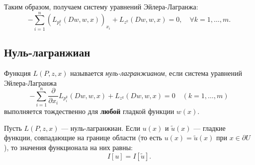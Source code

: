Таким образом, получаем систему уравнений Эйлера-Лагранжа:
\begin{equation}
    - \sum_{i=1}^n (L_{p_i^k} (Dw, w, x))_{x_i} + L_{z^k}(Dw, w, x) = 0, \quad \forall k = 1, \dots, m.
\end{equation}


\subsection{Нуль-лагранжиан}
\begin{definition}
    Функция $L(P, z, x)$ называется \textit{нуль-лагранжианом}, 
    если система уравнений Эйлера-Лагранжа
    \begin{equation}
        - \sum_{i=1}^n \frac{\partial}{\partial x_i} L_{p_i^k} (Dw, w, x) + 
        L_{z^k}(Dw, w, x) = 0 \quad (k = 1, \dots, m)
    \end{equation}
    выполняется тождественно для \textbf{любой} гладкой функции $w(x)$.
\end{definition}

\begin{theorem}
    Пусть $L(P, z, x)$ --- нуль-лагранжиан. 
    Если $u(x)$ и $\tilde{u}(x)$ --- гладкие функции, совпадающие на границе 
    области (то есть $u(x) = \tilde{u}(x)$ при $x \in \partial U$), 
    то значения функционала на них равны:
    \begin{equation}
        I[u] = I[\tilde{u}].
    \end{equation}
\end{theorem}

